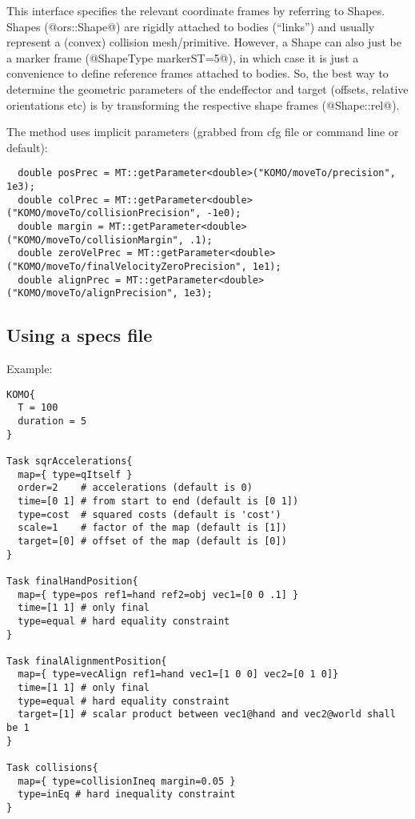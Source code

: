 \documentclass[10pt,fleqn,twoside]{article}
\begin{document}
This interface specifies the relevant coordinate frames by referring
to Shapes. Shapes (@ors::Shape@) are rigidly attached to bodies
(``links'') and usually represent a (convex) collision
mesh/primitive. However, a Shape can also just be a marker frame
(@ShapeType markerST=5@), in which case it is just a convenience to
define reference frames attached to bodies. So, the best way to
determine the geometric parameters of the endeffector and target
(offsets, relative orientations etc) is by transforming the respective
shape frames (@Shape::rel@).

The method uses implicit parameters (grabbed from cfg file or command line or default):
\begin{code}
\begin{verbatim}
  double posPrec = MT::getParameter<double>("KOMO/moveTo/precision", 1e3);
  double colPrec = MT::getParameter<double>("KOMO/moveTo/collisionPrecision", -1e0);
  double margin = MT::getParameter<double>("KOMO/moveTo/collisionMargin", .1);
  double zeroVelPrec = MT::getParameter<double>("KOMO/moveTo/finalVelocityZeroPrecision", 1e1);
  double alignPrec = MT::getParameter<double>("KOMO/moveTo/alignPrecision", 1e3);
\end{verbatim}
\end{code}


\subsection{Using a specs file}

Example:
\begin{code}
\begin{verbatim}
KOMO{
  T = 100
  duration = 5
}

Task sqrAccelerations{
  map={ type=qItself }
  order=2    # accelerations (default is 0)
  time=[0 1] # from start to end (default is [0 1])
  type=cost  # squared costs (default is 'cost')
  scale=1    # factor of the map (default is [1])
  target=[0] # offset of the map (default is [0])
}

Task finalHandPosition{
  map={ type=pos ref1=hand ref2=obj vec1=[0 0 .1] }
  time=[1 1] # only final
  type=equal # hard equality constraint
}

Task finalAlignmentPosition{
  map={ type=vecAlign ref1=hand vec1=[1 0 0] vec2=[0 1 0]}
  time=[1 1] # only final
  type=equal # hard equality constraint
  target=[1] # scalar product between vec1@hand and vec2@world shall be 1
}

Task collisions{
  map={ type=collisionIneq margin=0.05 }
  type=inEq # hard inequality constraint
}
\end{verbatim}
\end{code}
\end{document}
